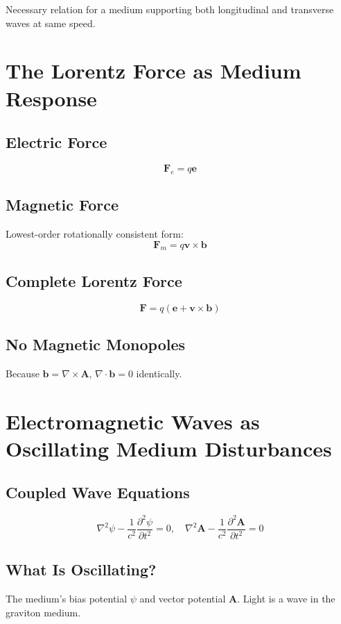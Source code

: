 \documentclass[12pt, a4paper]{article}
\begin{document}
Necessary relation for a medium supporting both longitudinal and transverse waves at same speed.

\section{The Lorentz Force as Medium Response}

\subsection{Electric Force}
\[
\mathbf{F}_e = q \mathbf{e}
\]

\subsection{Magnetic Force}

Lowest-order rotationally consistent form:
\[
\mathbf{F}_m = q \mathbf{v} \times \mathbf{b}
\]

\subsection{Complete Lorentz Force}
\[
\mathbf{F} = q(\mathbf{e} + \mathbf{v} \times \mathbf{b})
\]

\subsection{No Magnetic Monopoles}

Because \( \mathbf{b} = \nabla \times \mathbf{A} \), \( \nabla \cdot \mathbf{b} = 0 \) identically.

\section{Electromagnetic Waves as Oscillating Medium Disturbances}

\subsection{Coupled Wave Equations}
\[
\nabla^2 \psi - \frac{1}{c^2} \frac{\partial^2 \psi}{\partial t^2} = 0, \quad
\nabla^2 \mathbf{A} - \frac{1}{c^2} \frac{\partial^2 \mathbf{A}}{\partial t^2} = 0
\]

\subsection{What Is Oscillating?}

The medium's bias potential \( \psi \) and vector potential \( \mathbf{A} \). Light is a wave in the graviton medium.
\end{document}
